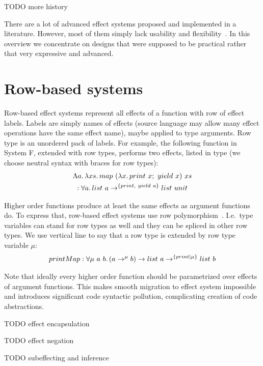 \documentclass[conference]{IEEEtran}
\newcommand{\seq}{;~}
\newcommand{\ap}{~}
\begin{document}
    TODO more history %

    There are a lot of advanced effect systems proposed and implemented in a literature.
    However, most of them simply lack usability and flexibility~\cite{odersky2022scoped}.
    In this overview we concentrate on designs that were supposed to be practical rather that very expressive and advanced.


    \section{Row-based systems}

    Row-based effect systems represent all effects of a function with row of effect labels.
    Labels are simply names of effects (source language may allow many effect operations have the same effect name), maybe applied to type arguments.
    Row type is an unordered pack of labels.
    For example, the following function in System F, extended with row types, performs two effects, listed in type (we choose neutral syntax with braces for row types):
    \begin{multline*}
        \Lambda a\ldotp\lambda xs\ldotp map \ap (\lambda x\ldotp print\ap x\seq yield\ap x) \ap xs \\ : \forall a \ldotp list\ap a \to^{\{print, ~yield \ap a\}} list \ap unit
    \end{multline*}

    Higher order functions produce at least the same effects as argument functions do.
    To express that, row-based effect systems use row polymorphism~\cite{gaster1996polymorphic}.
    I.e.\ type variables can stand for row types as well and they can be spliced in other row types.
    We use vertical line to say that a row type is extended by row type variable $\mu$:
    \begin{multline*}
        printMap : \forall \mu \ap a \ap b\ldotp (a \to^\mu b) \to list \ap a \to^{\{print|\mu\}} list \ap b
    \end{multline*}

    Note that ideally every higher order function should be parametrized over effects of argument functions.
    This makes smooth migration to effect system impossible and introduces significant code syntactic pollution, complicating creation of code abstractions.

    TODO effect encapsulation %

    TODO effect negation %

    TODO subeffecting and inference %
\end{document}
